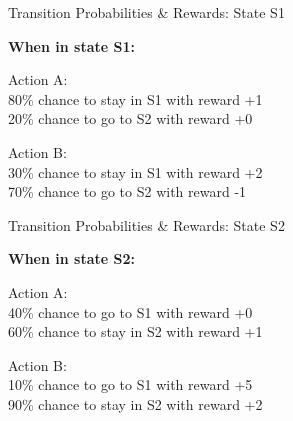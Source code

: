 \documentclass[aspectratio=169,xcolor=dvipsnames,svgnames,x11names,fleqn]{beamer}
\begin{document}
\begin{frame}{Transition Probabilities \& Rewards: State S1}
    
    \vspace{0.5cm}
    \begin{center}
    \large{
    \textbf{When in state S1:}
    }
    \end{center}
    
    \vspace{0.5cm}
    \begin{center}
    \large{
    Action A: \\
    80\% chance to stay in S1 with reward +1 \\
    20\% chance to go to S2 with reward +0
    }
    \end{center}
    
    \vspace{0.5cm}
    \begin{center}
    \large{
    Action B: \\
    30\% chance to stay in S1 with reward +2 \\
    70\% chance to go to S2 with reward -1
    }
    \end{center}
\end{frame}

\begin{frame}{Transition Probabilities \& Rewards: State S2}
    
    \vspace{0.5cm}
    \begin{center}
    \large{
    \textbf{When in state S2:}
    }
    \end{center}
    
    \vspace{0.5cm}
    \begin{center}
    \large{
    Action A: \\
    40\% chance to go to S1 with reward +0 \\
    60\% chance to stay in S2 with reward +1
    }
    \end{center}
    
    \vspace{0.5cm}
    \begin{center}
    \large{
    Action B: \\
    10\% chance to go to S1 with reward +5 \\
    90\% chance to stay in S2 with reward +2
    }
    \end{center}
    \end{frame}
    
\end{document}
